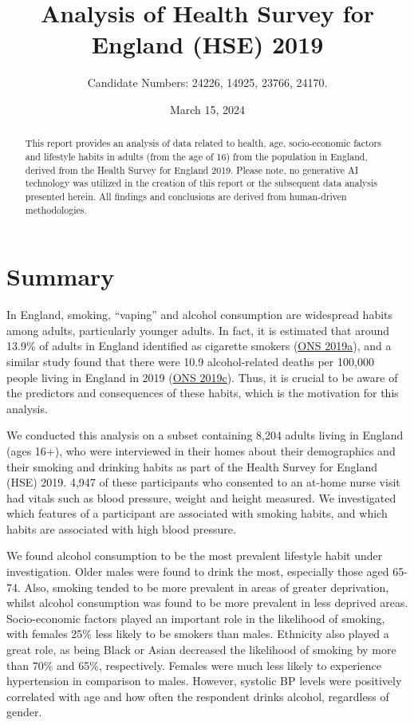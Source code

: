 \documentclass[
  11pt,
  twocolumn]{article}
\title{Analysis of Health Survey for England (HSE) 2019}
\author{Candidate Numbers: 24226, 14925, 23766, 24170.}
\date{March 15, 2024}
\begin{document}
\maketitle
\begin{abstract}
This report provides an analysis of data related to health, age,
socio-economic factors and lifestyle habits in adults (from the age of
16) from the population in England, derived from the Health Survey for
England 2019. Please note, no generative AI technology was utilized in
the creation of this report or the subsequent data analysis presented
herein. All findings and conclusions are derived from human-driven
methodologies.
\end{abstract}

\raggedbottom 
{}

\clearpage

\hypertarget{summary}{%
\section{Summary}\label{summary}}

In England, smoking, ``vaping'' and alcohol consumption are widespread
habits among adults, particularly younger adults. In fact, it is
estimated that around 13.9\% of adults in England identified as
cigarette smokers (\protect\hyperlink{ref-1ONS}{ONS 2019a}), and a
similar study found that there were 10.9 alcohol-related deaths per
100,000 people living in England in 2019
(\protect\hyperlink{ref-2ONS}{ONS 2019c}). Thus, it is crucial to be
aware of the predictors and consequences of these habits, which is the
motivation for this analysis.

We conducted this analysis on a subset containing 8,204 adults living in
England (ages 16+), who were interviewed in their homes about their
demographics and their smoking and drinking habits as part of the Health
Survey for England (HSE) 2019. 4,947 of these participants who consented
to an at-home nurse visit had vitals such as blood pressure, weight and
height measured. We investigated which features of a participant are
associated with smoking habits, and which habits are associated with
high blood pressure.

We found alcohol consumption to be the most prevalent lifestyle habit
under investigation. Older males were found to drink the most,
especially those aged 65-74. Also, smoking tended to be more prevalent
in areas of greater deprivation, whilst alcohol consumption was found to
be more prevalent in less deprived areas. Socio-economic factors played
an important role in the likelihood of smoking, with females 25\% less
likely to be smokers than males. Ethnicity also played a great role, as
being Black or Asian decreased the likelihood of smoking by more than
70\% and 65\%, respectively. Females were much less likely to experience
hypertension in comparison to males. However, systolic BP levels were
positively correlated with age and how often the respondent drinks
alcohol, regardless of gender.
\end{document}

